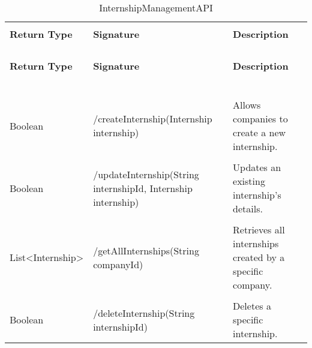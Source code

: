 \begin{longtable}{p{}p{}p{}}
    \caption{InternshipManagementAPI}
    \vspace{0.5em}\\
    \hline
    \vspace{0.5em}\\
    \textbf{Return Type} & \textbf{Signature} & \textbf{Description} \\
    \vspace{0.5em}\\
    \hline
    \vspace{0.5em}\\
    \endfirsthead
    \vspace{0.5em}\\
    \hline
    \vspace{0.5em}\\
    \textbf{Return Type} & \textbf{Signature} & \textbf{Description} \\
    \vspace{0.5em}\\
    \hline
    \vspace{0.5em}\\
    \endhead
    
    \vspace{0.5em}\\
    \hline
    \vspace{0.5em}\\
    \endfoot
    
    \vspace{0.5em}\\
    \hline
    \vspace{0.5em}\\
    \endlastfoot
    
    Boolean &
    /createInternship(Internship internship) &
    Allows companies to create a new internship. \\
    \vspace{0.5em}\\
    Boolean &
    /updateInternship(String internshipId, Internship internship) &
    Updates an existing internship's details. \\
    \vspace{0.5em}\\
    List<Internship> &
    /getAllInternships(String companyId) &
    Retrieves all internships created by a specific company. \\
    \vspace{0.5em}\\
    Boolean &
    /deleteInternship(String internshipId) &
    Deletes a specific internship. \\

\end{longtable}

